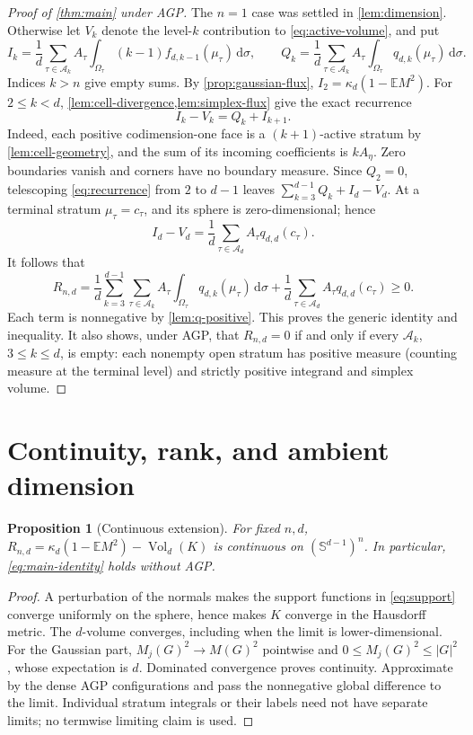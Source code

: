 \documentclass[10pt,reqno]{amsart}
\newtheorem{proposition}[theorem]{Proposition}
\theoremstyle{definition}
\theoremstyle{remark}
\newcommand{\E}{\mathbb E}
\newcommand{\Sphere}{\mathbb S}
\newcommand{\Vol}{\operatorname{Vol}}
\newcommand{\dd}{\,\mathrm d}
\begin{document}
\begin{proof}[Proof of \cref{thm:main} under AGP]
The $n=1$ case was settled in \cref{lem:dimension}. Otherwise let $V_k$ denote the level-$k$ contribution to \eqref{eq:active-volume}, and put
\[
I_k=\frac1d\sum_{\tau\in\mathcal A_k}A_\tau
\int_{\Omega_\tau}(k-1)f_{d,k-1}(\mu_\tau)\dd\sigma,
\qquad
Q_k=\frac1d\sum_{\tau\in\mathcal A_k}A_\tau
\int_{\Omega_\tau}q_{d,k}(\mu_\tau)\dd\sigma.
\]
Indices $k>n$ give empty sums. By \cref{prop:gaussian-flux}, $I_2=\kappa_d(1-\E M^2)$.
For $2\le k<d$, \cref{lem:cell-divergence,lem:simplex-flux} give the exact recurrence
\begin{equation}\label{eq:recurrence}
I_k-V_k=Q_k+I_{k+1}.
\end{equation}
Indeed, each positive codimension-one face is a $(k+1)$-active stratum by \cref{lem:cell-geometry}, and the sum of its incoming coefficients is $kA_\eta$. Zero boundaries vanish and corners have no boundary measure. Since $Q_2=0$, telescoping \eqref{eq:recurrence} from $2$ to $d-1$ leaves $\sum_{k=3}^{d-1}Q_k+I_d-V_d$.
At a terminal stratum $\mu_\tau=c_\tau$, and its sphere is zero-dimensional; hence
\[
I_d-V_d=\frac1d\sum_{\tau\in\mathcal A_d}A_\tau q_{d,d}(c_\tau).
\]
It follows that
\begin{equation}\label{eq:R-explicit}
\boxed{R_{n,d}=\frac1d\sum_{k=3}^{d-1}\sum_{\tau\in\mathcal A_k}
A_\tau\int_{\Omega_\tau}q_{d,k}(\mu_\tau)\dd\sigma
+\frac1d\sum_{\tau\in\mathcal A_d}A_\tau q_{d,d}(c_\tau)\ge0.}
\end{equation}
Each term is nonnegative by \cref{lem:q-positive}. This proves the generic identity and inequality. It also shows, under AGP, that $R_{n,d}=0$ if and only if every $\mathcal A_k$, $3\le k\le d$, is empty: each nonempty open stratum has positive measure (counting measure at the terminal level) and strictly positive integrand and simplex volume.
\end{proof}

\section{Continuity, rank, and ambient dimension}\label{sec:degenerate}
\begin{proposition}[Continuous extension]\label{prop:continuity}
For fixed $n,d$, $R_{n,d}=\kappa_d(1-\E M^2)-\Vol_d(K)$ is continuous on $(\Sphere^{d-1})^n$. In particular, \eqref{eq:main-identity} holds without AGP.
\end{proposition}
\begin{proof}
A perturbation of the normals makes the support functions in \eqref{eq:support} converge uniformly on the sphere, hence makes $K$ converge in the Hausdorff metric. The $d$-volume converges, including when the limit is lower-dimensional. For the Gaussian part, $M_j(G)^2\to M(G)^2$ pointwise and $0\le M_j(G)^2\le|G|^2$, whose expectation is $d$. Dominated convergence proves continuity. Approximate by the dense AGP configurations and pass the nonnegative global difference to the limit. Individual stratum integrals or their labels need not have separate limits; no termwise limiting claim is used.
\end{proof}
\end{document}
